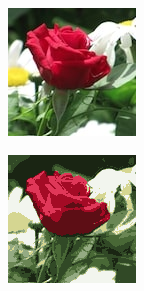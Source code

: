 \begin{figure}[htbp]
    \centering
    \caption{
        Case study: \texttt{flower-6.jpg}, $k=10$.
        Original image, reconstructed image using k-means, reconstruction error,
        and clusterings in sample space.
    }
    \begin{subfigure}[t]{0.32\textwidth}
        \includegraphics[width=\linewidth]{../../rust_code/data/kmeans/flower-6.jpg}
    \end{subfigure}
    \begin{subfigure}[t]{0.32\textwidth}
        \includegraphics[width=\linewidth]{../../python_code/plots/kmeans/flower-6/reconstruction.png}

\end{subfigure}
\end{figure}
